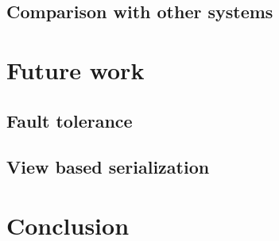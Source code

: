 \documentclass{uit-report}
\begin{document}
\subsection{Comparison with other systems}

\newpage
\section{Future work}
\subsection{Fault tolerance}
\subsection{View based serialization}

\newpage
\section{Conclusion}



\pagebreak



\end{document}
